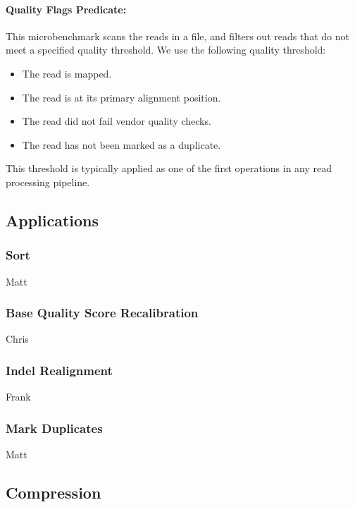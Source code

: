 \documentclass[10pt,twocolumn]{article}
\theoremstyle{plain}
\begin{document}
\paragraph{Quality Flags Predicate:}
\label{sec:quality-flags-predicate}

This microbenchmark scans the reads in a file, and filters out reads that do not meet a specified quality threshold. We use the following
quality threshold:

\begin{itemize}
\item The read is mapped.
\item The read is at its primary alignment position.
\item The read did not fail vendor quality checks.
\item The read has not been marked as a duplicate.
\end{itemize}

This threshold is typically applied as one of the first operations in any read processing pipeline. 

\subsection{Applications}
\label{sec:applications}

\subsubsection{Sort}
\label{sec:sort}

Matt

\subsubsection{Base Quality Score Recalibration}
\label{sec:bqsr-perf}

Chris

\subsubsection{Indel Realignment}
\label{sec:indel-realignment}

Frank

\subsubsection{Mark Duplicates}
\label{sec:mark-duplicates}

Matt

\subsection{Compression}
\label{sec:compression}
\end{document}
